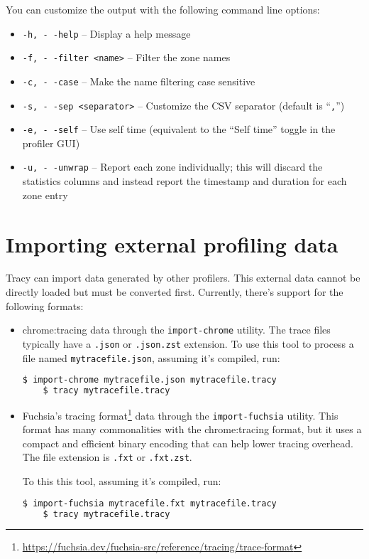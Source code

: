 \documentclass[hidelinks,titlepage,a4paper,twoside]{article}
\begin{document}
You can customize the output with the following command line options:

\begin{itemize}
  \item \texttt{-h, -\hspace{-1.25ex} -help} -- Display a help message
  \item \texttt{-f, -\hspace{-1.25ex} -filter <name>} -- Filter the zone names
  \item \texttt{-c, -\hspace{-1.25ex} -case} -- Make the name filtering case sensitive
  \item \texttt{-s, -\hspace{-1.25ex} -sep <separator>} -- Customize the CSV separator (default is ``\texttt{,}'')
  \item \texttt{-e, -\hspace{-1.25ex} -self} -- Use self time (equivalent to the ``Self time'' toggle in the profiler GUI)
  \item \texttt{-u, -\hspace{-1.25ex} -unwrap} -- Report each zone individually; this will discard the statistics columns and instead report the timestamp and duration for each zone entry
\end{itemize}

\section{Importing external profiling data}
\label{importingdata}

Tracy can import data generated by other profilers. This external data cannot be directly loaded but must be converted first.
Currently, there's support for the following formats:
\begin{itemize}
  \item chrome:tracing data through the \texttt{import-chrome} utility. The trace files
    typically have a \texttt{.json} or \texttt{.json.zst} extension.
    To use this tool to process a file named \texttt{mytracefile.json}, assuming it's compiled, run:
    \begin{lstlisting}[language=sh]
    $ import-chrome mytracefile.json mytracefile.tracy
    $ tracy mytracefile.tracy
    \end{lstlisting}
  \item Fuchsia's tracing format\footnote{\url{https://fuchsia.dev/fuchsia-src/reference/tracing/trace-format}}
    data through the \texttt{import-fuchsia} utility.
    This format has many commonalities with the chrome:tracing format, but it uses a
    compact and efficient binary encoding that can help lower tracing overhead.
    The file extension is \texttt{.fxt} or \texttt{.fxt.zst}.

    To this this tool, assuming it's compiled, run:
    \begin{lstlisting}[language=sh]
    $ import-fuchsia mytracefile.fxt mytracefile.tracy
    $ tracy mytracefile.tracy
    \end{lstlisting}
\end{itemize}
\end{document}

